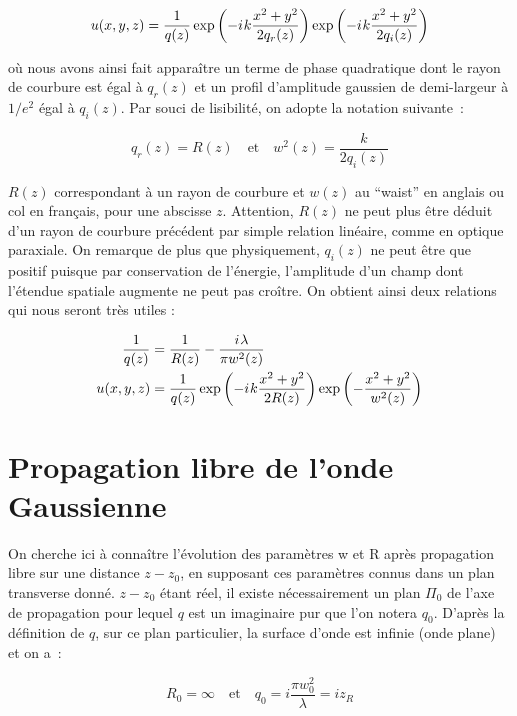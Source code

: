\documentclass[a4paper]{book}
\newcommand{\iu}{{i\mkern1mu}}
\begin{document}
\begin{equation}
    u(x,y,z)=\frac{1}{q(z)}\exp\left(-\iu k \frac{x^2 + y^2}{2q_r(z)}\right)\exp\left(-\iu k \frac{x^2 + y^2}{2q_i(z)}\right)
\end{equation}

où nous avons ainsi fait apparaître un terme de phase quadratique dont le rayon de courbure est égal à $q_r(z)$ et un profil d'amplitude gaussien de demi-largeur à $1/e^2$ égal à $q_i(z)$. Par souci de lisibilité, on adopte la notation suivante~:

\begin{equation}
    q_r(z)=R(z)\quad\mathrm{et}\quad w^2(z)=\frac{k}{2q_i(z)}
\end{equation}

$R(z)$ correspondant à un rayon de courbure et $w(z)$ au ``waist'' en anglais ou col en français, pour une abscisse $z$. Attention, $R(z)$ ne peut plus être déduit d'un rayon de courbure précédent par simple relation linéaire, comme en optique paraxiale. On remarque de plus que physiquement, $q_i(z)$ ne peut être que positif puisque par conservation de l'énergie, l'amplitude d'un champ dont l'étendue spatiale augmente ne peut pas croître. 
On obtient ainsi deux relations qui nous seront très utiles :

\begin{align}
    \frac{1}{q(z)}&=\frac{1}{R(z)}-\frac{\iu \lambda}{\pi w^2(z)}\\
    u(x,y,z)&=\frac{1}{q(z)}\exp\left(-\iu k \frac{x^2 + y^2}{2R(z)}\right)\exp\left(-\frac{x^2 + y^2}{w^2(z)}\right)
\end{align}
    


\section{Propagation libre de l'onde Gaussienne}

On cherche ici à connaître l'évolution des paramètres w et R après propagation libre sur une distance $z-z_0$, en supposant ces paramètres connus dans un plan transverse donné. $z-z_0$ étant réel, il existe nécessairement un plan $\Pi_0$ de l'axe de propagation pour lequel $q$ est un imaginaire pur que l'on notera $q_0$. D'après la définition de $q$, sur ce plan particulier, la surface d'onde est infinie (onde plane) et on a~:

\begin{equation}
    R_0 = \infty \quad \textrm{et} \quad q_0=i\frac{\pi w_0^2}{\lambda} = iz_R
\end{equation}
\end{document}
